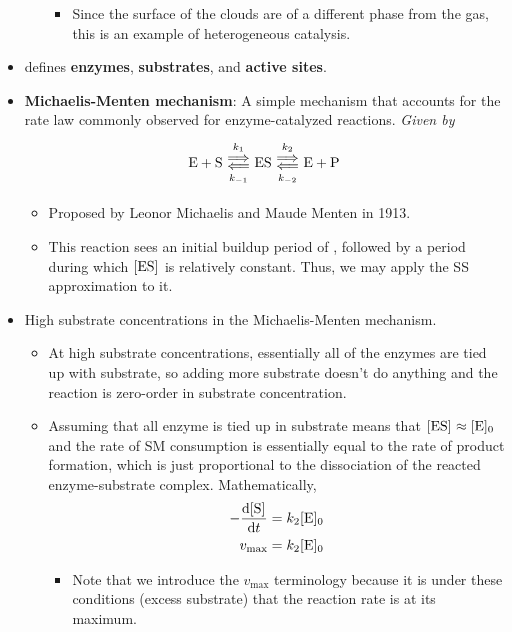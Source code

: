 \documentclass[../notes.tex]{subfiles}
\begin{document}
\begin{itemize}
\begin{itemize}
        \begin{itemize}
            \item Since the surface of the clouds are of a different phase from the gas, this is an example of heterogeneous catalysis.
        \end{itemize}
    \end{itemize}
    \item \textcite{bib:McQuarrieSimon} defines \textbf{enzymes}, \textbf{substrates}, and \textbf{active sites}.
    \item \textbf{Michaelis-Menten mechanism}: A simple mechanism that accounts for the rate law commonly observed for enzyme-catalyzed reactions. \emph{Given by}
    \begin{equation*}
        \ce{E + S} \Longleftrightarrows[k_1][k_{-1}] \ce{ES} \Longleftrightarrows[k_2][k_{-2}] \ce{E + P}
    \end{equation*}
    \begin{itemize}
        \item Proposed by Leonor Michaelis and Maude Menten in 1913.
        \item This reaction sees an initial buildup period of , followed by a period during which $\cnc{ES}$ is relatively constant. Thus, we may apply the SS approximation to it.
    \end{itemize}
    \item High substrate concentrations in the Michaelis-Menten mechanism.
    \begin{itemize}
        \item At high substrate concentrations, essentially all of the enzymes are tied up with substrate, so adding more substrate doesn't do anything and the reaction is zero-order in substrate concentration.
        \item Assuming that all enzyme is tied up in substrate means that $\cnc{ES}\approx\cnc[0]{E}$ and the rate of SM consumption is essentially equal to the rate of product formation, which is just proportional to the dissociation of the reacted enzyme-substrate complex. Mathematically,
        \begin{align*}
            -\dv{\cnc{S}}{t} &= k_2\cnc[0]{E}\\
            v_\text{max} &= k_2\cnc[0]{E}
        \end{align*}
        \begin{itemize}
            \item Note that we introduce the $v_\text{max}$ terminology because it is under these conditions (excess substrate) that the reaction rate is at its maximum.

\end{itemize}
\end{itemize}
\end{itemize}
\end{document}
